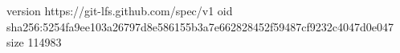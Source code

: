 version https://git-lfs.github.com/spec/v1
oid sha256:5254fa9ee103a26797d8e586155b3a7e662828452f59487cf9232c4047d0e047
size 114983
